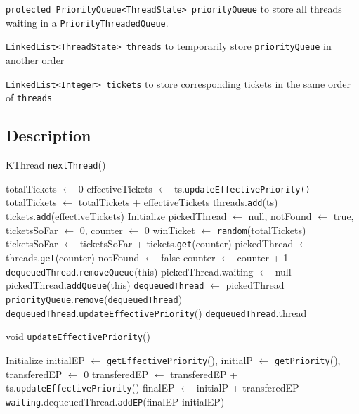 \documentclass{article}
\begin{document}
\begin{spacing}{1.1}
\texttt{protected PriorityQueue<ThreadState> priorityQueue} to store all threads waiting in a \texttt{PriorityThreadedQueue}.

\texttt{LinkedList<ThreadState> threads} to temporarily store \texttt{priorityQueue} in another order

\texttt{LinkedList<Integer> tickets} to store corresponding tickets in the same order of \texttt{threads}

\subsection{Description}

\begin{algorithm}[htbp]
  \caption{KThread \texttt{nextThread}()}
\begin{algorithmic}[1]
  \State totalTickets $\gets$ 0
    \State effectiveTickets $\gets$ ts.\texttt{updateEffectivePriority()}
    \State totalTickets $\gets$ totalTickets + effectiveTickets
    \State threads.\texttt{add}(ts)
    \State tickets.\texttt{add}(effectiveTickets)
  \EndFor
  \State Initialize pickedThread $\leftarrow$ null, notFound $\leftarrow$ true, ticketsSoFar $\leftarrow$ 0, counter $\leftarrow$ 0
  \State winTicket $\leftarrow$ \texttt{random}(totalTickets)
    \State ticketsSoFar $\leftarrow$ ticketsSoFar + tickets.\texttt{get}(counter)
      \State pickedThread $\leftarrow$ threads.\texttt{get}(counter)
      \State notFound $\leftarrow$ false
    \EndIf
    \State counter $\leftarrow$ counter + 1
  \EndWhile
  \State \texttt{dequeuedThread}.\texttt{removeQueue}(this)
  \State pickedThread.waiting $\leftarrow$ null
  \State pickedThread.\texttt{addQueue}(this)
  \State \texttt{dequeuedThread} $\leftarrow$ pickedThread
  \State \texttt{priorityQueue}.\texttt{remove}(\texttt{dequeuedThread})
  \State \texttt{dequeuedThread}.\texttt{updateEffectivePriority}()
  \Return \texttt{dequeuedThread}.thread
\end{algorithmic}
\end{algorithm}

\begin{algorithm}[htbp]
  \caption{void \texttt{updateEffectivePriority}()}
\begin{algorithmic}[1]
  \State Initialize initialEP $\leftarrow$ \texttt{getEffectivePriority}(), initialP $\leftarrow$ \texttt{getPriority}(), transferedEP $\leftarrow$ 0
      \State transferedEP $\leftarrow$ transferedEP + ts.\texttt{updateEffectivePriority}()
    \EndFor
  \EndFor
  \State finalEP $\leftarrow$ initialP + transferedEP
  \State \texttt{waiting}.dequeuedThread.\texttt{addEP}(finalEP-initialEP)
\end{algorithmic}
\end{algorithm}


\end{spacing}
\end{document}

